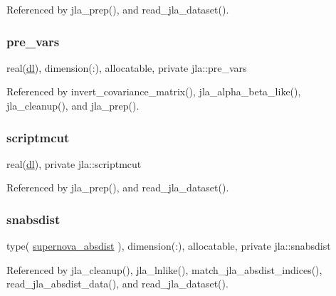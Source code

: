Referenced by jla\+\_\+prep(), and read\+\_\+jla\+\_\+dataset().

\mbox{\label{namespacejla_aa01e50e6176267ba591eec0a0f61bfa2}} 
\subsubsection{\texorpdfstring{pre\+\_\+vars}{pre\_vars}}
{\footnotesize\ttfamily real(\mbox{\hyperlink{namespacejla_a3aa6435b4e08f1d532390186ac608741}{dl}}), dimension(\+:), allocatable, private jla\+::pre\+\_\+vars\hspace{0.3cm}{\ttfamily [private]}}



Referenced by invert\+\_\+covariance\+\_\+matrix(), jla\+\_\+alpha\+\_\+beta\+\_\+like(), jla\+\_\+cleanup(), and jla\+\_\+prep().

\mbox{\label{namespacejla_af11758b53916846ed4875f3664797cb4}} 
\subsubsection{\texorpdfstring{scriptmcut}{scriptmcut}}
{\footnotesize\ttfamily real(\mbox{\hyperlink{namespacejla_a3aa6435b4e08f1d532390186ac608741}{dl}}), private jla\+::scriptmcut\hspace{0.3cm}{\ttfamily [private]}}



Referenced by jla\+\_\+prep(), and read\+\_\+jla\+\_\+dataset().

\mbox{\label{namespacejla_ac714ae18a12d4b4a726b05c017fd1e92}} 
\subsubsection{\texorpdfstring{snabsdist}{snabsdist}}
{\footnotesize\ttfamily type( \mbox{\hyperlink{structjla_1_1supernova__absdist}{supernova\+\_\+absdist}} ), dimension(\+:), allocatable, private jla\+::snabsdist\hspace{0.3cm}{\ttfamily [private]}}



Referenced by jla\+\_\+cleanup(), jla\+\_\+lnlike(), match\+\_\+jla\+\_\+absdist\+\_\+indices(), read\+\_\+jla\+\_\+absdist\+\_\+data(), and read\+\_\+jla\+\_\+dataset().

